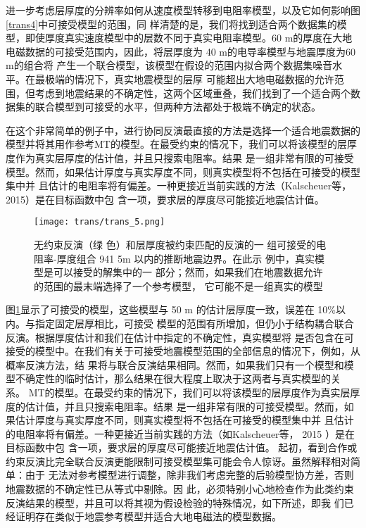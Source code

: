 进一步考虑层厚度的分辨率如何从速度模型转移到电阻率模型，以及它如何影响图\ref{trans4}中可接受模型的范围，同 样清楚的是，我们将找到适合两个数据集的模型，即使厚度真实速度模型中的层数不同于真实电阻率模型。60 m的厚度在大地电磁数据的可接受范围内，因此，将层厚度为 40 m的电导率模型与地震厚度为60 m的组合将 产生一个联合模型，该模型在假设的范围内拟合两个数据集噪音水平。在最极端的情况下，真实地震模型的层厚 可能超出大地电磁数据的允许范围，但考虑到地震结果的不确定性，这两个区域重叠，我们找到了一个适合两个数据集的联合模型到可接受的水平，但两种方法都处于极端不确定的状态。

在这个非常简单的例子中，进行协同反演最直接的方法是选择一个适合地震数据的模型并将其用作参考MT的模型。在最受约束的情况下，我们可以将该模型的层厚度作为真实层厚度的估计值，并且只搜索电阻率。结果 是一组非常有限的可接受模型。然而，如果估计厚度与真实厚度不同，则真实模型将不包括在可接受的模型集中并 且估计的电阻率将有偏差。一种更接近当前实践的方法（Kalscheuer等， 2015）是在目标函数中包 含一项，要求层的厚度尽可能接近地震估计值。

\begin{figure}[H]
    \centering
    \texttt{[image: trans/trans\_5.png]}
    \caption{无约束反演（绿 色）和层厚度被约束匹配的反演的一 组可接受的电阻率-厚度组合 941 5m 以内的推断地震边界。在此示 例中，真实模型是可以接受的解集中的一 部分；然而，如果我们在地震数据允许的范围的最末端选择了一个参考模型， 它可能不是一组真实的模型}\label{trans5}

\end{figure}

图\ref{trans5}显示了可接受的模型，这些模型与 50 m 的估计层厚度一致，误差在 10\%以内。与指定固定层厚相比，可接受 模型的范围有所增加，但仍小于结构耦合联合反演。根据厚度估计和我们在估计中指定的不确定性，真实模型将 是否包含在可接受的模型中。在我们有关于可接受地震模型范围的全部信息的情况下，例如，从概率反演方法，结 果将与联合反演结果相同。然而，如果我们只有一个模型和模型不确定性的临时估计，那么结果在很大程度上取决于这两者与真实模型的关 系。 MT的模型。在最受约束的情况下，我们可以将该模型的层厚度作为真实层厚度的估计值，并且只搜索电阻率。结果 是一组非常有限的可接受模型。然而，如果估计厚度与真实厚度不同，则真实模型将不包括在可接受的模型集中并 且估计的电阻率将有偏差。一种更接近当前实践的方法（如Kalscheuer等， 2015 ）是在目标函数中包 含一项，要求层的厚度尽可能接近地震估计值。 起初，看到合作或约束反演比完全联合反演更能限制可接受模型集可能会令人惊讶。虽然解释相对简单：由于 无法对参考模型进行调整，除非我们考虑完整的后验模型协方差，否则地震数据的不确定性已从等式中剔除。因 此，必须特别小心地检查作为此类约束反演结果的模型，并且可以将其视为假设检验的特殊情况，如下所述，即我 们已经证明存在类似于地震参考模型并适合大地电磁法的模型数据。

